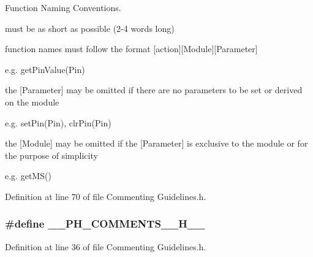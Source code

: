 Function Naming Conventions. 


\begin{DoxyItemize}
\item must be as short as possible (2-\/4 words long)
\item function names must follow the format [action][Module][Parameter]
\begin{DoxyItemize}
\item e.\-g. get\-Pin\-Value(\-Pin)
\end{DoxyItemize}
\item the [Parameter] may be omitted if there are no parameters to be set or derived on the module
\begin{DoxyItemize}
\item e.\-g. set\-Pin(\-Pin), clr\-Pin(\-Pin)
\end{DoxyItemize}
\item the [Module] may be omitted if the [Parameter] is exclusive to the module or for the purpose of simplicity
\begin{DoxyItemize}
\item e.\-g. get\-M\-S() 
\end{DoxyItemize}
\end{DoxyItemize}

Definition at line 70 of file Commenting Guidelines.\-h.

\subsubsection[{\-\_\-\-\_\-\-P\-H\-\_\-\-C\-O\-M\-M\-E\-N\-T\-S\-\_\-\-\_\-\-H\-\_\-\-\_\-}]{\setlength{\rightskip}{0pt plus 5cm}\#define \-\_\-\-\_\-\-P\-H\-\_\-\-C\-O\-M\-M\-E\-N\-T\-S\-\_\-\-\_\-\-H\-\_\-\-\_\-}\label{_commenting_01_guidelines_8h_a9775ef95daddfe5e2f6dfc499769c6d8}


Definition at line 36 of file Commenting Guidelines.\-h.

